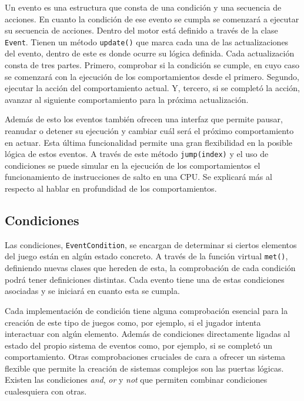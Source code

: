 \medskip

Un evento es una estructura que consta de una condición y una secuencia de acciones. En cuanto la condición de ese evento se cumpla se comenzará a ejecutar su secuencia de acciones. Dentro del motor está definido a través de la clase \texttt{Event}. Tienen un método \texttt{update()} que marca cada una de las actualizaciones del evento, dentro de este es donde ocurre su lógica definida. Cada actualización consta de tres partes. Primero, comprobar si la condición se cumple, en cuyo caso se comenzará con la ejecución de los comportamientos desde el primero. Segundo, ejecutar la acción del comportamiento actual. Y, tercero, si se completó la acción, avanzar al siguiente comportamiento para la próxima actualización. 

\medskip

Además de esto los eventos también ofrecen una interfaz que permite pausar, reanudar o detener su ejecución y cambiar cuál será el próximo comportamiento en actuar. Esta última funcionalidad permite una gran flexibilidad en la posible lógica de estos eventos. A través de este método \texttt{jump(index)} y el uso de condiciones se puede simular en la ejecución de los comportamientos el funcionamiento de instrucciones de salto en una CPU. Se explicará más al respecto al hablar en profundidad de los comportamientos. 

\subsection{Condiciones}
Las condiciones, \texttt{EventCondition}, se encargan de determinar si ciertos elementos del juego están en algún estado concreto. A través de la función virtual \texttt{met()}, definiendo nuevas clases que hereden de esta, la comprobación de cada condición podrá tener definiciones distintas. Cada evento tiene una de estas condiciones asociadas y se iniciará en cuanto esta se cumpla. 

\medskip

Cada implementación de condición tiene alguna comprobación esencial para la creación de este tipo de juegos como, por ejemplo, si el jugador intenta interactuar con algún elemento. Además de condiciones directamente ligadas al estado del propio sistema de eventos como, por ejemplo, si se completó un comportamiento. Otras comprobaciones cruciales de cara a ofrecer un sistema flexible que permite la creación de sistemas complejos son las puertas lógicas. Existen las condiciones \textit{and}, \textit{or} y \textit{not} que permiten combinar condiciones cualesquiera con otras. 

